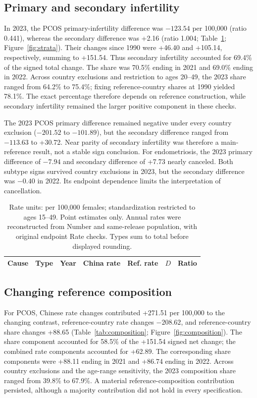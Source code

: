\documentclass[11pt,a4paper]{article}
\begin{document}
\subsection{Primary and secondary infertility}
In 2023, the PCOS primary-infertility difference was $-123.54$ per 100,000 (ratio 0.441), whereas the secondary difference was +2.16 (ratio 1.004; Table~\ref{tab:strata}; Figure~\ref{fig:strata}). Their changes since 1990 were +46.40 and +105.14, respectively, summing to +151.54. Thus secondary infertility accounted for 69.4\% of the signed total change. The share was 70.5\% ending in 2021 and 69.0\% ending in 2022. Across country exclusions and restriction to ages 20--49, the 2023 share ranged from 64.2\% to 75.4\%; fixing reference-country shares at 1990 yielded 78.1\%. The exact percentage therefore depends on reference construction, while secondary infertility remained the larger positive component in these checks.

The 2023 PCOS primary difference remained negative under every country exclusion ($-201.52$ to $-101.89$), but the secondary difference ranged from $-113.63$ to +30.72. Near parity of secondary infertility was therefore a main-reference result, not a stable sign conclusion. For endometriosis, the 2023 primary difference of $-7.94$ and secondary difference of +7.73 nearly canceled. Both subtype signs survived country exclusions in 2023, but the secondary difference was $-0.40$ in 2022. Its endpoint dependence limits the interpretation of cancellation.

\begin{table}[htbp]\centering\small{}
\caption{Primary and secondary infertility prevalence at the endpoints.}\label{tab:strata}
\setlength{\tabcolsep}{4pt}
\begin{tabular}{lllrrrr}\toprule
Cause & Type & Year & China rate & Ref. rate & $D$ & Ratio\\\midrule
\end{tabular}
\caption*{Rate units: per 100,000 females; standardization restricted to ages 15--49. Point estimates only. Annual rates were reconstructed from Number and same-release population, with original endpoint Rate checks. Types sum to total before displayed rounding.}
\end{table}

\subsection{Changing reference composition}
For PCOS, Chinese rate changes contributed +271.51 per 100,000 to the changing contrast, reference-country rate changes $-208.62$, and reference-country share changes +88.65 (Table~\ref{tab:composition}; Figure~\ref{fig:composition}). The share component accounted for 58.5\% of the +151.54 signed net change; the combined rate components accounted for +62.89. The corresponding share components were +88.11 ending in 2021 and +86.74 ending in 2022. Across country exclusions and the age-range sensitivity, the 2023 composition share ranged from 39.8\% to 67.9\%. A material reference-composition contribution persisted, although a majority contribution did not hold in every specification.
\end{document}
